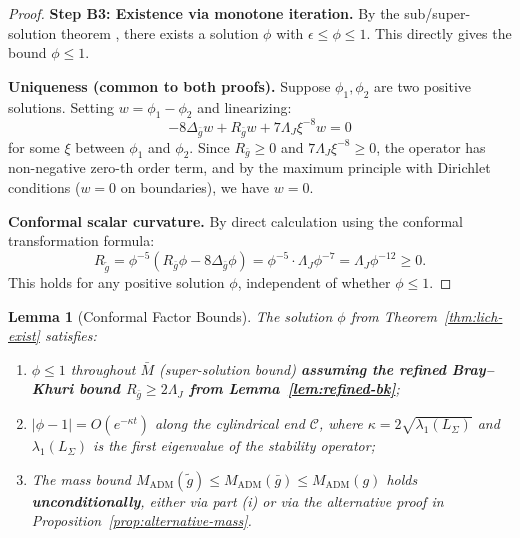 \documentclass[12pt]{article}
\theoremstyle{plain}
\newtheorem{lemma}[theorem]{Lemma}
\theoremstyle{definition}
\theoremstyle{remark}
\newcommand{\ADM}{\mathrm{ADM}}
\newcommand{\tg}{\tilde{g}}
\newcommand{\bg}{\bar{g}}
\newcommand{\bM}{\bar{M}}
\begin{document}
\begin{proof}
\textbf{Step B3: Existence via monotone iteration.} By the sub/super-solution theorem \cite[Chapter 4]{gilbargtrudinger2001}, there exists a solution $\phi$ with $\epsilon \leq \phi \leq 1$. This directly gives the bound $\phi \leq 1$.

\bigskip

\textbf{Uniqueness (common to both proofs).} Suppose $\phi_1, \phi_2$ are two positive solutions. Setting $w = \phi_1 - \phi_2$ and linearizing:
\[
-8\Delta_{\bg}w + R_{\bg}w + 7\Lambda_J \xi^{-8}w = 0
\]
for some $\xi$ between $\phi_1$ and $\phi_2$. Since $R_{\bg} \geq 0$ and $7\Lambda_J \xi^{-8} \geq 0$, the operator has non-negative zero-th order term, and by the maximum principle with Dirichlet conditions ($w = 0$ on boundaries), we have $w = 0$.

\textbf{Conformal scalar curvature.} By direct calculation using the conformal transformation formula:
\[
R_{\tg} = \phi^{-5}(R_{\bg}\phi - 8\Delta_{\bg}\phi) = \phi^{-5} \cdot \Lambda_J \phi^{-7} = \Lambda_J \phi^{-12} \geq 0.
\]
This holds for any positive solution $\phi$, independent of whether $\phi \leq 1$.
\end{proof}

\begin{lemma}[Conformal Factor Bounds]\label{lem:phi-bound}
The solution $\phi$ from Theorem~\ref{thm:lich-exist} satisfies:
\begin{enumerate}[label=\textup{(\roman*)}]
    \item $\phi \leq 1$ throughout $\bM$ (super-solution bound) \textbf{assuming the refined Bray--Khuri bound $R_{\bg} \geq 2\Lambda_J$ from Lemma~\ref{lem:refined-bk}};
    \item $|\phi - 1| = O(e^{-\kappa t})$ along the cylindrical end $\mathcal{C}$, where $\kappa = 2\sqrt{\lambda_1(L_\Sigma)}$ and $\lambda_1(L_\Sigma)$ is the first eigenvalue of the stability operator;
    \item The mass bound $M_{\ADM}(\tg) \leq M_{\ADM}(\bg) \leq M_{\ADM}(g)$ holds \textbf{unconditionally}, either via part (i) or via the alternative proof in Proposition~\ref{prop:alternative-mass}.
\end{enumerate}
\end{lemma}
\end{document}
